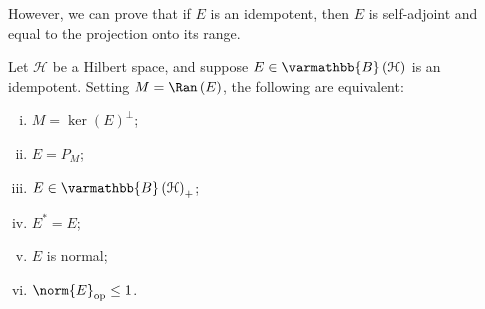 \documentclass[10pt]{mypackage}
\renewcommand*{\mathbb}[1]{\varmathbb{#1}}
\newcommand{\B}{\mathbb{B}}
\begin{document}
However, we can prove that if $E$ is an idempotent, then $E$ is self-adjoint and equal to the projection onto its range.
\begin{proposition}
  Let $\mathcal{H}$ be a Hilbert space, and suppose $E\in \B\left(\mathcal{H}\right)$ is an idempotent. Setting $M = \Ran\left(E\right)$, the following are equivalent:
  \begin{enumerate}[(i)]
    \item $M = \ker\left(E\right)^{\perp}$;
    \item $E = P_M$;
    \item $E \in \B\left(\mathcal{H}\right)_{+}$;
    \item $E^{\ast}=E$;
    \item $E$ is normal;
    \item $\norm{E}_{\text{op}}\leq 1$.
  \end{enumerate}
\end{proposition}
\end{document}
